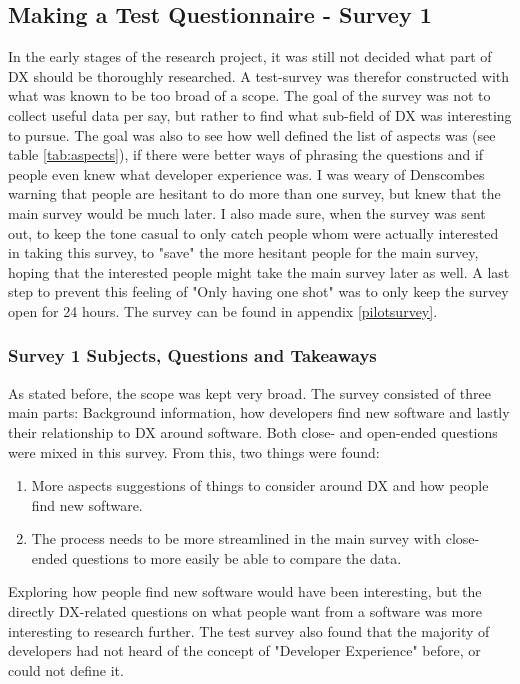 \documentclass{cslthse-msc}
\begin{document}
    \subsection{Making a Test Questionnaire - Survey 1}
    In the early stages of the research project, it was still not decided what part of DX should be thoroughly researched.
    A test-survey was therefor constructed with what was known to be too broad of a scope. The goal of the survey was not to collect
    useful data per say, but rather to find what sub-field of DX was interesting to pursue. The goal was also to see how well defined the list of aspects was (see table \ref{tab:aspects}), if there were better ways of phrasing the questions and if people even knew what developer experience was. I was weary of Denscombes warning that people are hesitant to do more than one survey, but knew that the main survey would be much later. I also made sure, when the survey was sent out, to keep the tone casual to only catch people whom were actually interested in taking this survey, to "save" the more hesitant people for the main survey, hoping that the interested people might take the main survey later as well. A last step to prevent this feeling of "Only having one shot" was to only keep the survey open for 24 hours. The survey can be found in appendix \ref{pilotsurvey}.

    \subsubsection{Survey 1 Subjects, Questions and Takeaways}
    As stated before, the scope was kept very broad. The survey consisted of three main parts: Background information, how developers find new software and lastly their relationship to DX around software. Both close- and open-ended questions were mixed in this survey. From this, two things were found:
    \begin{enumerate}
        \item More aspects suggestions of things to consider around DX and how people find new software.
        \item The process needs to be more streamlined in the main survey with close-ended questions to more easily be able to compare the data.
    \end{enumerate}

    Exploring how people find new software would have been interesting, but the directly DX-related questions on what people want from a software was more interesting to research further. The test survey also found that the majority of developers had not heard of the concept of "Developer Experience" before, or could not define it.
\end{document}
